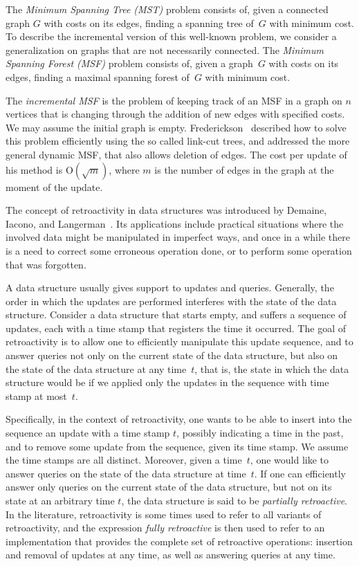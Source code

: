 \documentclass[reqno,11pt]{amsart}
\newcommand{\Oh}{\mathrm{O}}
\begin{document}
The \emph{Minimum Spanning Tree (MST)} problem consists of, given a connected 
graph $G$ with costs on its edges, finding a spanning tree of~$G$ with minimum cost. 
To describe the incremental version of this well-known problem, 
we consider a generalization on graphs that are not necessarily connected. 
The \emph{Minimum Spanning Forest (MSF)} problem consists of, given a graph~$G$ with 
costs on its edges, finding a maximal spanning forest of~$G$ with minimum cost. 

The \emph{incremental MSF} is the problem of keeping track of an MSF in a graph on 
$n$ vertices that is changing through the addition of new edges with specified costs.  
We may assume the initial graph is empty. 
Frederickson~\cite{Frederickson1983} described how to solve this problem efficiently 
using the so called link-cut trees, and addressed the more general dynamic MSF, 
that also allows deletion of edges.  The cost per update of his method is $\Oh(\sqrt{m})$, 
where $m$ is the number of edges in the graph at the moment of the update.

The concept of retroactivity in data structures was introduced by Demaine, Iacono, 
and Langerman~\cite{DemaineIL2007}.  Its applications include practical situations 
where the involved data might be manipulated in imperfect ways, and once in a while 
there is a need to correct some erroneous operation done, or to perform some operation 
that was forgotten.

A data structure usually gives support to updates and queries.  
Generally, the order in which the updates are performed interferes with the state 
of the data structure. 
Consider a data structure that starts empty, and suffers a sequence of updates, 
each with a time stamp that registers the time it occurred. 
The goal of retroactivity is to allow one to efficiently manipulate this update sequence, 
and to answer queries not only on the current state of the data structure, 
but also on the state of the data structure at any time~$t$, that is, 
the state in which the data structure would be if we applied only the updates 
in the sequence with time stamp at most~$t$.

Specifically, in the context of retroactivity, one wants to be able to insert into 
the sequence an update with a time stamp $t$, possibly indicating a time in the past, 
and to remove some update from the sequence, given its time stamp.
We assume the time stamps are all distinct.  Moreover, given a time~$t$, 
one would like to answer queries on the state of the data structure at time~$t$. 
If one can efficiently answer only queries on the current state of the data structure, 
but not on its state at an arbitrary time $t$, the data structure is said to be 
\emph{partially retroactive}.  In the literature, retroactivity is some times used 
to refer to all variants of retroactivity, and the expression \emph{fully retroactive}
is then used to refer to an implementation that provides the complete set of retroactive
operations: insertion and removal of updates at any time, as well as answering queries 
at any time. 
\end{document}
